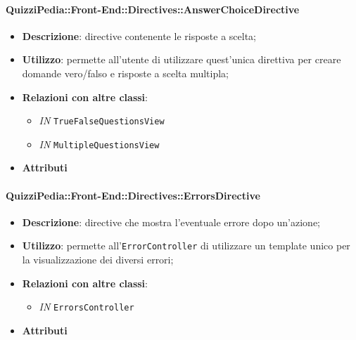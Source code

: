 \paragraph{QuizziPedia::Front-End::Directives::AnswerChoiceDirective}
\begin{itemize}
	\item \textbf{Descrizione}: directive contenente le risposte a scelta;
	\item \textbf{Utilizzo}: permette all'utente di utilizzare quest'unica direttiva per creare domande vero/falso e risposte a scelta multipla;
	\item \textbf{Relazioni con altre classi}:
	\begin{itemize}
		\item \textit{IN} \texttt{TrueFalseQuestionsView} \\
		\item \textit{IN} \texttt{MultipleQuestionsView} \\
	\end{itemize}
	\item \textbf{Attributi}
\end{itemize}

\paragraph{QuizziPedia::Front-End::Directives::ErrorsDirective}
\begin{itemize}
	\item \textbf{Descrizione}: directive che mostra l'eventuale errore dopo un'azione;
	\item \textbf{Utilizzo}: permette all'\texttt{ErrorController} di utilizzare un template unico per la visualizzazione dei diversi errori;
	\item \textbf{Relazioni con altre classi}:
	\begin{itemize}
		\item \textit{IN} \texttt{ErrorsController} \\
	\end{itemize}
	\item \textbf{Attributi}
\end{itemize}

